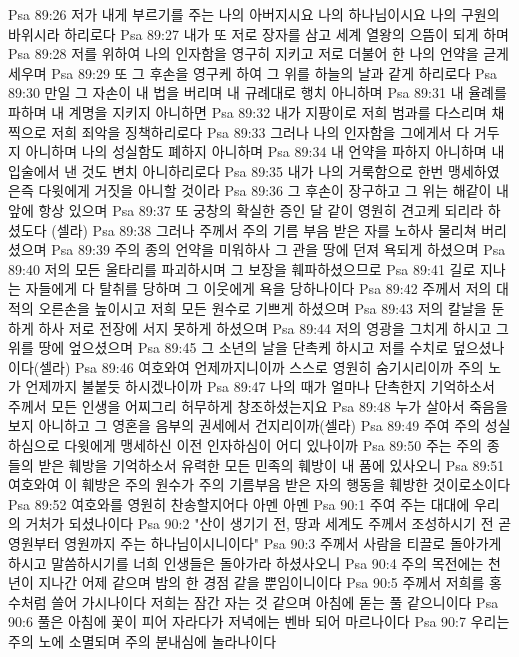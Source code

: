 Psa 89:26  저가 내게 부르기를 주는 나의 아버지시요 나의 하나님이시요 나의 구원의 바위시라 하리로다
Psa 89:27  내가 또 저로 장자를 삼고 세계 열왕의 으뜸이 되게 하며
Psa 89:28  저를 위하여 나의 인자함을 영구히 지키고 저로 더불어 한 나의 언약을 귿게 세우며
Psa 89:29  또 그 후손을 영구케 하여 그 위를 하늘의 날과 같게 하리로다
Psa 89:30  만일 그 자손이 내 법을 버리며 내 규례대로 행치 아니하며
Psa 89:31  내 율례를 파하며 내 계명을 지키지 아니하면
Psa 89:32  내가 지팡이로 저희 범과를 다스리며 채찍으로 저희 죄악을 징책하리로다
Psa 89:33  그러나 나의 인자함을 그에게서 다 거두지 아니하며 나의 성실함도 폐하지 아니하며
Psa 89:34  내 언약을 파하지 아니하며 내 입술에서 낸 것도 변치 아니하리로다
Psa 89:35  내가 나의 거룩함으로 한번 맹세하였은즉 다윗에게 거짓을 아니할 것이라
Psa 89:36  그 후손이 장구하고 그 위는 해같이 내 앞에 항상 있으며
Psa 89:37  또 궁창의 확실한 증인 달 같이 영원히 견고케 되리라 하셨도다 (셀라)
Psa 89:38  그러나 주께서 주의 기름 부음 받은 자를 노하사 물리쳐 버리셨으며
Psa 89:39  주의 종의 언약을 미워하사 그 관을 땅에 던져 욕되게 하셨으며
Psa 89:40  저의 모든 울타리를 파괴하시며 그 보장을 훼파하셨으므로
Psa 89:41  길로 지나는 자들에게 다 탈취를 당하며 그 이웃에게 욕을 당하나이다
Psa 89:42  주께서 저의 대적의 오른손을 높이시고 저희 모든 원수로 기쁘게 하셨으며
Psa 89:43  저의 칼날을 둔하게 하사 저로 전장에 서지 못하게 하셨으며
Psa 89:44  저의 영광을 그치게 하시고 그 위를 땅에 엎으셨으며
Psa 89:45  그 소년의 날을 단촉케 하시고 저를 수치로 덮으셨나이다(셀라)
Psa 89:46  여호와여 언제까지니이까 스스로 영원히 숨기시리이까 주의 노가 언제까지 불붙듯 하시겠나이까
Psa 89:47  나의 때가 얼마나 단촉한지 기억하소서 주께서 모든 인생을 어찌그리 허무하게 창조하셨는지요
Psa 89:48  누가 살아서 죽음을 보지 아니하고 그 영혼을 음부의 권세에서 건지리이까(셀라)
Psa 89:49  주여 주의 성실하심으로 다윗에게 맹세하신 이전 인자하심이 어디 있나이까
Psa 89:50  주는 주의 종들의 받은 훼방을 기억하소서 유력한 모든 민족의 훼방이 내 품에 있사오니
Psa 89:51  여호와여 이 훼방은 주의 원수가 주의 기름부음 받은 자의 행동을 훼방한 것이로소이다
Psa 89:52  여호와를 영원히 찬송할지어다 아멘 아멘
Psa 90:1  주여 주는 대대에 우리의 거처가 되셨나이다
Psa 90:2  "산이 생기기 전, 땅과 세계도 주께서 조성하시기 전 곧 영원부터 영원까지 주는 하나님이시니이다"
Psa 90:3  주께서 사람을 티끌로 돌아가게 하시고 말씀하시기를 너희 인생들은 돌아가라 하셨사오니
Psa 90:4  주의 목전에는 천년이 지나간 어제 같으며 밤의 한 경점 같을 뿐임이니이다
Psa 90:5  주께서 저희를 홍수처럼 쓸어 가시나이다 저희는 잠간 자는 것 같으며 아침에 돋는 풀 같으니이다
Psa 90:6  풀은 아침에 꽃이 피어 자라다가 저녁에는 벤바 되어 마르나이다
Psa 90:7  우리는 주의 노에 소멸되며 주의 분내심에 놀라나이다
